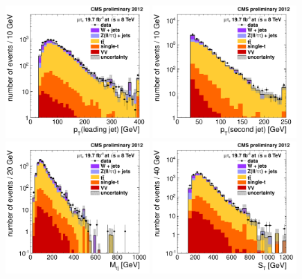 \documentclass[12pt]{thesis}  %
\begin{document}
\begin{figure}[hbtp]
  \begin{center}
    \includegraphics[width=0.49\textwidth]{figures/mutau/mainselection/leadseljetpt.pdf}
    \includegraphics[width=0.49\textwidth]{figures/mutau/mainselection/secondseljetpt.pdf} \\
    \includegraphics[width=0.49\textwidth]{figures/mutau/mainselection/masstaub.pdf}    
    \includegraphics[width=0.49\textwidth]{figures/mutau/mainselection/st.pdf}

\end{center}
\end{figure}
\end{document}
